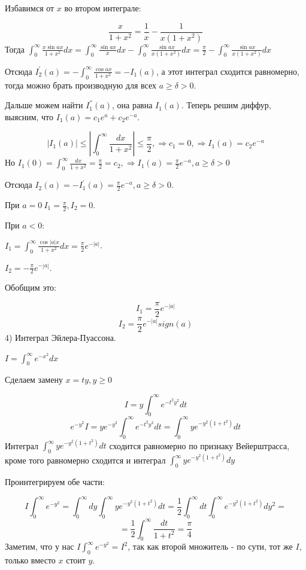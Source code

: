 \documentclass[12pt]{article}
\begin{document}
Избавимся от $x$ во втором интеграле:\par
$$\frac{x}{1+x^2} = \frac{1}{x} - \frac{1}{x(1+x^2)}$$
Тогда $\int_0^\infty \frac{x\sin{ax}}{1+x^2}dx = \int_0^\infty \frac{\sin{ax}}{x} dx - \int_0^\infty \frac{\sin{ax}}{x(1+x^2)} dx = \frac{\pi}{2} - \int_0^\infty \frac{\sin{ax}}{x(1+x^2)}dx$\par
Отсюда $I^{'}_2(a) = -\int_0^\infty \frac{\cos{ax}}{1+x^2} = -I_1(a)$, а этот интеграл сходится равномерно, тогда можно брать производную для всех $a \geq \delta > 0$.\par
Дальше можем найти $I^{''}_1(a)$, она равна $I_1(a)$. Теперь решим диффур, выясним, что $I_1(a) = c_1 e^a + c_2 e^{-a}$.\par
$$|I_1(a)| \leq |\int_0^\infty \frac{dx}{1+x^2}| \leq \frac{\pi}{2}, \Rightarrow c_1 = 0, \Rightarrow I_1(a) = c_2 e^{-a}$$
Но $I_1(0) = \int_0^\infty \frac{dx}{1+x^2} = \frac{\pi}{2} = c_2, \Rightarrow I_1(a) = \frac{\pi}{2} e^{-a}, a \geq \delta > 0$\par
Отсюда $I_2(a) = -I^{'}_1(a) = \frac{\pi}{2} e^{-a}, a \geq \delta > 0$.\par
При $a = 0 \ I_1 = \frac{\pi}{2}, I_2 = 0$.\par
При $a < 0$:\par
\indent $I_1 = \int_0^\infty \frac{\cos{|a|x}}{1+x^2} dx = \frac{\pi}{2} e^{-|a|}$.\par
\indent $I_2 = -\frac{\pi}{2} e^{-|a|}$.\par
Обобщим это:\par
$$I_1 = \frac{\pi}{2} e^{-|a|}$$
$$I_2 = \frac{\pi}{2} e^{-|a|} sign(a)$$
4) Интеграл Эйлера-Пуассона.\par
$I = \int_0^\infty e^{-x^2} dx$\par
Сделаем замену $x = ty, y \geq 0$\par
$$I = y \int_0^\infty e^{-t^2y^2} dt$$
$$e^{-y^2} I = y e^{-y^2} \int_0^\infty e^{-t^2y^2} dt = \int_0^\infty ye^{-y^2(1+t^2)}dt$$
Интеграл $\int_0^\infty ye^{-y^2(1+t^2)} dt$ сходится равномерно по признаку Вейерштрасса, кроме того равномерно сходится и интеграл $\int_0^\infty ye^{-y^2(1+t^2)}dy$\par
Проинтегрируем обе части:\par
$$I \int_0^\infty e^{-y^2} = \int_0^\infty dy \int_0^\infty ye^{-y^2(1+t^2)} dt = \frac{1}{2} \int_0^\infty dt \int_0^\infty e^{-y^2(1+t^2)} dy^2 =$$
$$= \frac{1}{2} \int_0^\infty \frac{dt}{1+t^2} = \frac{\pi}{4}$$
Заметим, что у нас $I \int_0^\infty e^{-y^2} = I^2$, так как второй множитель - по сути, тот же $I$, только вместо $x$ стоит $y$.\par
\end{document}
